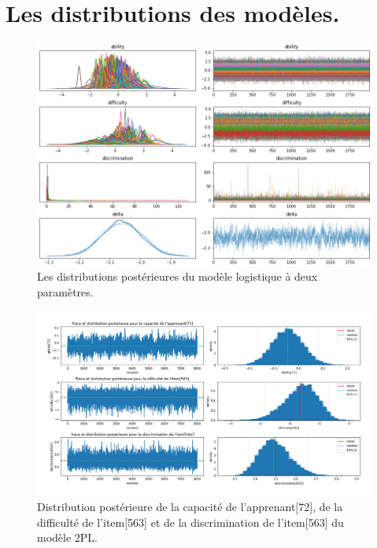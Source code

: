 \chapter{Les distributions des modèles.}
\begin{figure}[H]
	\begin{center}
		\includegraphics[width=\textwidth]{images/annexe/model_plot-trace2.png}
	\end{center}
	\caption{Les distributions postérieures du modèle logistique à deux paramètres.}
	\label{model_trace-plot2}
\end{figure}

\begin{figure}[H]
	\begin{center}
		\includegraphics[width=\textwidth]{images/annexe/params_posterior_distribution2.png}
	\end{center}
	\caption{Distribution postérieure de la capacité de l’apprenant[72], de la difficulté de l’item[563] et de la discrimination de l’item[563] du modèle 2PL.}
	\label{params_posterior_distribution_2pl}
\end{figure}


